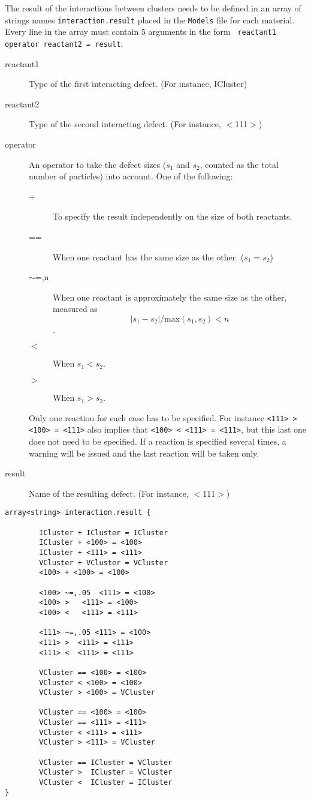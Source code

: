 The result of the interactions between clusters needs to be defined in an array of strings names {\tt interaction.result} placed in the {\tt Models} file for each material. Every line in the array must contain 5 arguments in the form \verb+ reactant1 operator reactant2 = result+.
\begin{description}
\item [reactant1] Type of the first interacting defect. (For instance, ICluster)
\item [reactant2] Type of the second interacting defect. (For instance, $<$111$>$)
\item [operator] An operator to take the defect sizes ($s_1$ and $s_2$, counted as the total number of particles) into account. One of the following:
  \begin{description}
    \item [+] To specify the result independently on the size of both reactants.
    \item [==] When one reactant has the same size as the other. ($s_1 = s_2$)
    \item [$\sim$=,n] When one reactant is approximately the same size as the other, measured as $$|s_1 - s_2|/\mathrm{max}(s_1,s_2) < n$$.
    \item [$<$] When $s_1 < s_2$.
    \item [$>$] When $s_1 > s_2$.
  \end{description}
Only one reaction for each case has to be specified. For instance \verb+<111> > <100> = <111>+ also implies that \verb+<100> < <111> = <111>+, but this last one does not need to be specified. If a reaction is specified several times, a warning will be issued and the last reaction will be taken only.
\item [result] Name of the resulting defect. (For instance, $<$111$>$)
\end{description}


\begin{lstlisting}
array<string> interaction.result {

        ICluster + ICluster = ICluster
        ICluster + <100> = <100>
        ICluster + <111> = <111>      
        VCluster + VCluster = VCluster
        <100> + <100> = <100> 

        <100> ~=,.05  <111> = <100>
        <100> >   <111> = <100>
        <100> <   <111> = <111>

        <111> ~=,.05 <111> = <100>
        <111> >  <111> = <111>        
        <111> <  <111> = <111>        

        VCluster == <100> = <100>
        VCluster < <100> = <100>
        VCluster > <100> = VCluster

        VCluster == <100> = <100>
        VCluster == <111> = <111>
        VCluster < <111> = <111>
        VCluster > <111> = VCluster

        VCluster == ICluster = VCluster
        VCluster >  ICluster = VCluster
        VCluster <  ICluster = ICluster
}
\end{lstlisting}

